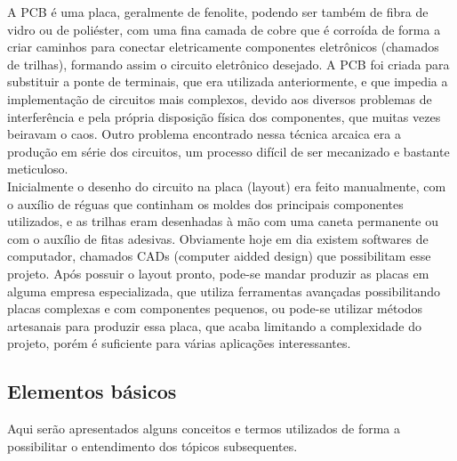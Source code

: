 A PCB \'e uma placa, geralmente de fenolite, podendo ser tamb\'em de fibra de vidro ou de poli\'ester, com uma fina camada de cobre que \'e corro\'ida de forma a criar caminhos para conectar eletricamente componentes eletr\^onicos (chamados de trilhas), formando assim o circuito eletr\^onico desejado. A PCB foi criada para substituir a ponte de terminais, que era utilizada anteriormente, e que impedia a implementaç\~ao de circuitos mais complexos, devido aos diversos problemas de interfer\^encia e pela pr\'opria disposiç\~ao f\'isica dos componentes, que muitas vezes beiravam o caos. Outro problema encontrado nessa t\'ecnica arcaica era a produç\~ao em s\'erie dos circuitos, um processo dif\'icil de ser mecanizado e bastante meticuloso.
\\Inicialmente o desenho do circuito na placa (layout) era feito manualmente, com o aux\'ilio de r\'eguas que continham os moldes dos principais componentes utilizados, e as trilhas eram desenhadas \`a m\~ao com uma caneta permanente ou com o aux\'ilio de fitas adesivas. Obviamente hoje em dia existem softwares de computador, chamados CADs (computer aidded design) que possibilitam esse projeto. Ap\'os possuir o  layout pronto, pode-se mandar produzir as placas em alguma empresa especializada, que utiliza ferramentas avançadas possibilitando placas complexas e com componentes pequenos, ou pode-se utilizar m\'etodos artesanais para produzir essa placa, que acaba limitando a complexidade do projeto, por\'em \'e suficiente para v\'arias aplicaç\~oes interessantes.

\subsection{Elementos b\'asicos}

Aqui ser\~ao apresentados alguns conceitos e termos utilizados de forma a possibilitar o entendimento dos t\'opicos subsequentes.

